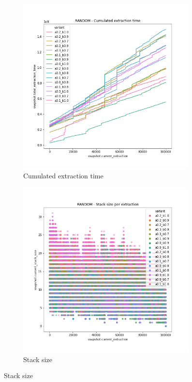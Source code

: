 \begin{figure}
    \centering
    \begin{subfigure}[b]{0.45\textwidth}
        \centering
        \includegraphics[width=0.99\textwidth]{./fragments/04_experimental_execution/images/04_alphabeta_detail_random.png.0_0.png}
        \caption{Cumulated extraction time}
        \label{FIG:05_ALPHABETA_BENCHMARK_RANDOM__0_0}
    \end{subfigure}
    \begin{subfigure}[b]{0.45\textwidth}
        \centering
        \includegraphics[width=0.99\textwidth]{./fragments/04_experimental_execution/images/04_alphabeta_detail_random.png.2_0.png}
        \caption{Stack size}
        \label{FIG:05_ALPHABETA_BENCHMARK_RANDOM__0_0}
    \end{subfigure}


\end{figure}

